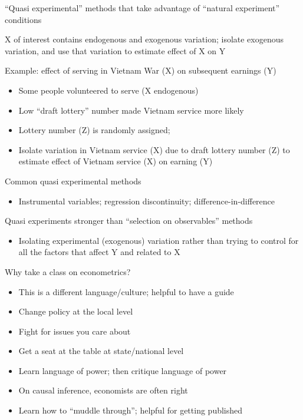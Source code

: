 \begin{frame}[shrink=10]{``Quasi experimental'' methods that take advantage of ``natural experiment'' conditions}
	
	X of interest contains endogenous and exogenous variation; isolate exogenous variation, and use that variation to estimate effect of X on Y
	\vspace{2mm}
	
	Example: effect of serving in Vietnam War (X) on subsequent earnings (Y)
	\begin{itemize}
		\item Some people volunteered to serve (X endogenous)
		\item Low ``draft lottery'' number made Vietnam service more likely
		\item Lottery number (Z) is randomly assigned; 
		\item Isolate variation in Vietnam service (X) due to draft lottery number (Z) to estimate effect of Vietnam service (X) on earning (Y) 
	\end{itemize}
	\vspace{2mm}	
	Common quasi experimental methods
	\begin{itemize}
		\item Instrumental variables; regression discontinuity; difference-in-difference
	\end{itemize}
	\vspace{2mm}
	Quasi experiments stronger than ``selection on observables'' methods
	\begin{itemize}
		\item Isolating experimental (exogenous) variation rather than trying to control for all the factors that affect Y and related to X
	\end{itemize}


\end{frame}

\begin{frame}{Why take a class on econometrics?}
	\begin{itemize}
		\item This is a different language/culture; helpful to have a guide
		\item Change policy at the local level
		\item Fight for issues you care about
		\item Get a seat at the table at state/national level
		\item Learn language of power; then critique language of power
		\item On causal inference, economists are often right
		\item Learn how to ``muddle through''; helpful for getting published

	\end{itemize}
\end{frame}


